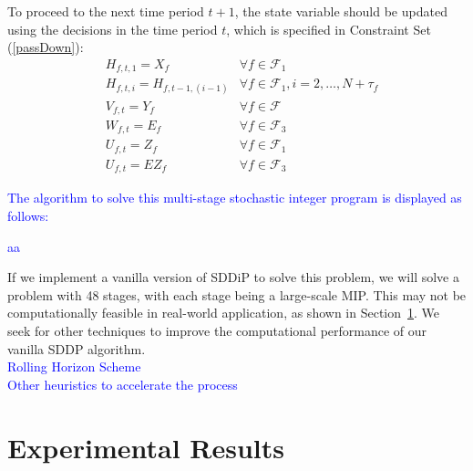 \documentclass[12pt]{article}
\begin{document}
	To proceed to the next time period \(t+1\), the state variable should be updated using the decisions in the time period \(t\), which is specified in Constraint Set (\ref{passDown}):
	\begin{align*}
		& H_{f,t,1} = X_f & \forall f \in \mathcal{F}_1\\
		& H_{f,t,i} = H_{f,t-1,(i-1)} & \forall f \in \mathcal{F}_1, i = 2, \dots, N+\tau_f\\
		& V_{f,t} = Y_f & \forall f \in \mathcal{F}\\
		& W_{f,t} = E_f & \forall f \in \mathcal{F}_3\\
		& U_{f,t} = Z_f & \forall f \in \mathcal{F}_1\\
		& U_{f,t} = EZ_f & \forall f \in \mathcal{F}_3
	\end{align*}
	\textcolor{blue}{The algorithm to solve this multi-stage stochastic integer program is displayed as follows:\\
	\begin{algorithm}[H]
		aa
	\end{algorithm}}
	\noindent If we implement a vanilla version of SDDiP to solve this problem, we will solve a problem with 48 stages, with each stage being a large-scale MIP. This may not be computationally feasible in real-world application, as shown in Section~\ref{expResults}. We seek for other techniques to improve the computational performance of our vanilla SDDP algorithm.\\
	\newline
	\textcolor{blue}{Rolling Horizon Scheme}\\
	\textcolor{blue}{Other heuristics to accelerate the process}
\section{Experimental Results}\label{expResults}

\nocite{*}


\end{document}
